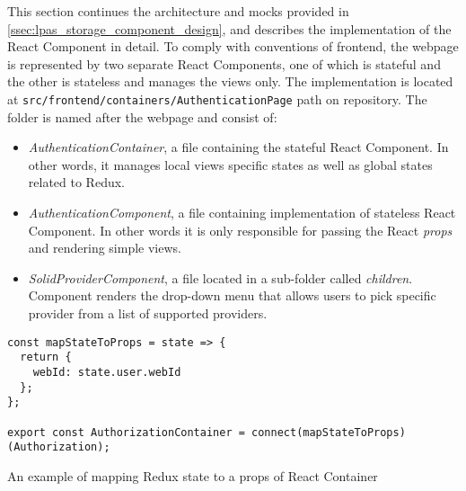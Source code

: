 This section continues the architecture and mocks provided in \autoref{ssec:lpas_storage_component_design}, and describes the implementation of the React Component in detail.
To comply with conventions of \lpa{} frontend, the webpage is represented by two separate React Components, one of which is stateful and the other is stateless and manages the views only. The implementation is located at \texttt{src\-/frontend\-/containers\-/AuthenticationPage} path on \lpa{} repository. The folder is named after the webpage and consist of:
\begin{itemize}
    \item \textit{AuthenticationContainer}, a file containing the stateful React Component. In other words, it manages local views specific states as well as global states related to Redux.
    \item \textit{AuthenticationComponent}, a file containing implementation of stateless React Component. In other words it is only responsible for passing the React \textit{props} and rendering simple views.
    \item \textit{SolidProviderComponent}, a file located in a sub-folder called \textit{children}. Component renders the drop-down menu that allows users to pick specific provi\-der from a list of supported \solid{} providers.
\end{itemize}

\begin{listing}[H]    
\begin{verbatim}
const mapStateToProps = state => {
  return {
    webId: state.user.webId
  };
};

export const AuthorizationContainer = connect(mapStateToProps)(Authorization);
\end{verbatim}
\caption{An example of mapping Redux state to a props of React Container} 
\label{lst:map_state_to_props_example}
\end{listing}

